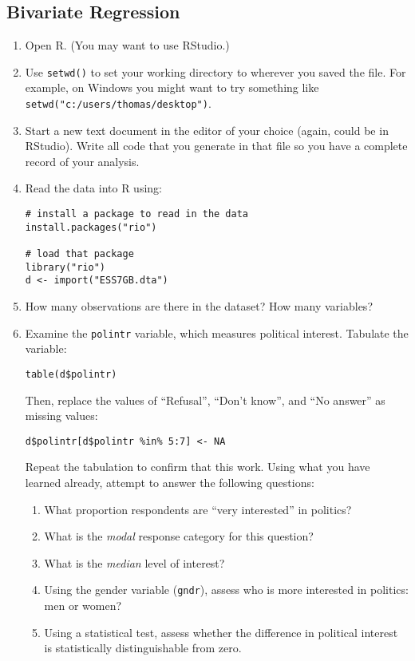 \documentclass[a4paper,12pt]{article}
\begin{document}
\subsection{Bivariate Regression}

\begin{enumerate}

\item Open R. (You may want to use RStudio.)

\item Use \texttt{setwd()} to set your working directory to wherever you saved the file. For example, on Windows you might want to try something like \texttt{setwd("c:/users/thomas/desktop")}.

\item Start a new text document in the editor of your choice (again, could be in RStudio). Write all code that you generate in that file so you have a complete record of your analysis.

\item Read the data into R using: 

\begin{verbatim}
# install a package to read in the data
install.packages("rio")

# load that package
library("rio")
d <- import("ESS7GB.dta")
\end{verbatim}

\item How many observations are there in the dataset? How many variables?

\item Examine the \texttt{polintr} variable, which measures political interest. Tabulate the variable:

\begin{verbatim}
table(d$polintr)
\end{verbatim}

\noindent Then, replace the values of ``Refusal'', ``Don't know'', and ``No answer'' as missing values: 

\begin{verbatim}
d$polintr[d$polintr %in% 5:7] <- NA
\end{verbatim}

\noindent Repeat the tabulation to confirm that this work. Using what you have learned already, attempt to answer the following questions:

\begin{enumerate}
\item What proportion respondents are ``very interested'' in politics?	
\item What is the \textit{modal} response category for this question?
\item What is the \textit{median} level of interest?
\item Using the gender variable (\texttt{gndr}), assess who is more interested in politics: men or women?
\item Using a statistical test, assess whether the difference in political interest is statistically distinguishable from zero.
\end{enumerate}


\end{enumerate}
\end{document}
